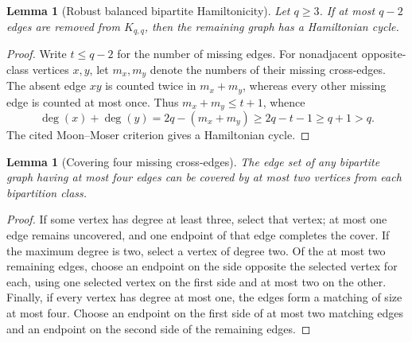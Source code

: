 \documentclass[11pt,letterpaper]{article}
\newtheorem{lemma}[theorem]{Lemma}
\begin{document}
\begin{lemma}[Robust balanced bipartite Hamiltonicity]\label{lem:hami}
Let $q\ge3$.  If at most $q-2$ edges are removed from $K_{q,q}$,
then the remaining graph has a Hamiltonian cycle.
\end{lemma}
\begin{proof}
Write $t\le q-2$ for the number of missing edges.  For
nonadjacent opposite-class vertices $x,y$, let $m_x,m_y$ denote
the numbers of their missing cross-edges.  The absent edge $xy$
is counted twice in $m_x+m_y$, whereas every other missing edge
is counted at most once.  Thus $m_x+m_y\le t+1$, whence
\[
\deg(x)+\deg(y)=2q-(m_x+m_y)
\ge 2q-t-1\ge q+1>q.
\]
The cited Moon--Moser criterion gives a Hamiltonian cycle.
\end{proof}

\begin{lemma}[Covering four missing cross-edges]\label{lem:four}
The edge set of any bipartite graph having at most four edges
can be covered by at most two vertices from each bipartition class.
\end{lemma}
\begin{proof}
If some vertex has degree at least three, select that vertex;
at most one edge remains uncovered, and one endpoint of that edge
completes the cover.  If the maximum degree is two, select a
vertex of degree two.  Of the at most two remaining edges, choose
an endpoint on the side opposite the selected vertex for each,
using one selected vertex on the first side and at most two on
the other.  Finally, if every vertex has degree at most one, the
edges form a matching of size at most four.  Choose an endpoint
on the first side of at most two matching edges and an endpoint
on the second side of the remaining edges.
\end{proof}
\end{document}
